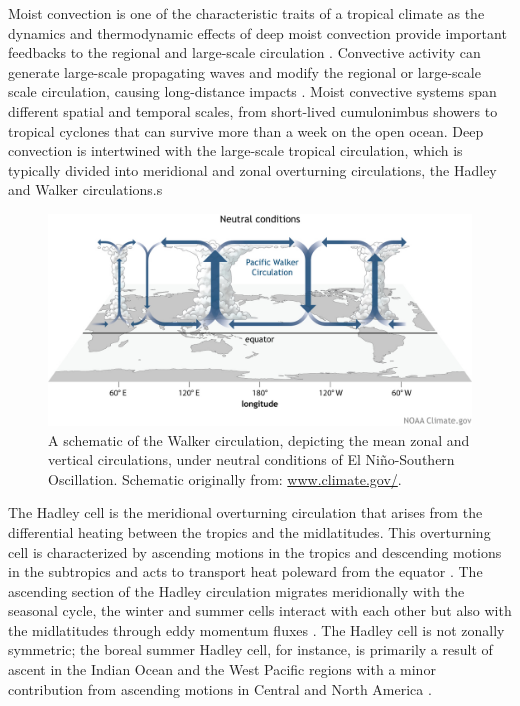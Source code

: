 
 Moist convection is one of the characteristic traits of a tropical climate as the dynamics and thermodynamic effects of deep moist convection provide important feedbacks to the regional and large-scale circulation \citep{emanuel1994atmospheric,webster2020dynamics}. 
Convective activity can generate large-scale propagating waves and modify the regional or large-scale scale circulation, causing long-distance impacts \citep{hartmann2015,li2018fundamentals}.
 Moist convective systems span different spatial and temporal scales, from short-lived cumulonimbus showers to tropical cyclones that can survive more than a week on the open ocean. Deep convection is intertwined with the large-scale tropical circulation, which is typically divided into meridional and zonal overturning circulations, the Hadley and Walker circulations.s
 
\begin{figure}[t!]
\includegraphics[width=\linewidth]{figures/Walker_Neutral_large.jpg}
\caption[The Walker circulation]{A schematic of the Walker circulation, depicting the mean zonal and vertical circulations, under neutral conditions of El Niño-Southern Oscillation. Schematic originally from: \url{www.climate.gov/}. }
\label{fig:walker_schematic}
\end{figure}
 
 
The Hadley cell is the meridional overturning circulation that arises from the differential heating between the tropics and the midlatitudes. This overturning cell is characterized by ascending motions in the tropics and descending motions in the subtropics and acts to transport heat poleward from the equator \citep{lorenz1967}.  The ascending section of the Hadley circulation migrates meridionally with the seasonal cycle, the winter and summer cells interact with each other but also with the midlatitudes through eddy momentum fluxes \citep{bordoni2008monsoons}. 
The Hadley cell is not zonally symmetric; the boreal summer Hadley cell, for instance,  is primarily a result of ascent in the Indian Ocean and the West Pacific regions with a minor contribution from ascending motions in Central and North America \citep{hoskins2020}. 

